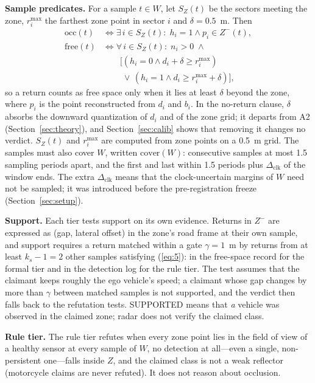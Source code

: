 \textbf{Sample predicates.} For a sample $t \in W$, let $S_Z(t)$ be the sectors meeting the zone, $r_i^{\max}$ the farthest zone point in sector $i$ and $\delta = 0.5$~m. Then
\begin{align}
\mathrm{occ}(t) &\iff \exists\, i \in S_Z(t):\; h_i = 1 \wedge p_i \in Z^-(t), \label{eq:5}\\
\mathrm{free}(t) &\iff \forall\, i \in S_Z(t):\; n_i > 0 \;\wedge \nonumber\\
&\qquad \big[(h_i = 0 \wedge d_i + \delta \ge r_i^{\max}) \nonumber\\
&\qquad\; \vee\, (h_i = 1 \wedge d_i \ge r_i^{\max} + \delta)\big], \label{eq:6}
\end{align}
so a return counts as free space only when it lies at least $\delta$ beyond the zone, where $p_i$ is the point reconstructed from $d_i$ and $b_i$. In the no-return clause, $\delta$ absorbs the downward quantization of $d_i$ and of the zone grid; it departs from A2 (Section~\ref{sec:theory}), and Section~\ref{sec:calib} shows that removing it changes no verdict. $S_Z(t)$ and $r_i^{\max}$ are computed from zone points on a 0.5~m grid. The samples must also cover $W$, written $\mathrm{cover}(W)$: consecutive samples at most 1.5 sampling periods apart, and the first and last within 1.5 periods plus $\Delta_{\mathrm{clk}}$ of the window ends. The extra $\Delta_{\mathrm{clk}}$ means that the clock-uncertain margins of $W$ need not be sampled; it was introduced before the pre-registration freeze (Section~\ref{sec:setup}).

\textbf{Support.} Each tier tests support on its own evidence. Returns in $Z^-$ are expressed as (gap, lateral offset) in the zone's road frame at their own sample, and support requires a return matched within a gate $\gamma = 1$~m by returns from at least $k_s - 1 = 2$ other samples satisfying (\ref{eq:5}): in the free-space record for the formal tier and in the detection log for the rule tier. The test assumes that the claimant keeps roughly the ego vehicle's speed; a claimant whose gap changes by more than $\gamma$ between matched samples is not supported, and the verdict then falls back to the refutation tests. SUPPORTED means that \emph{a} vehicle was observed in the claimed zone; radar does not verify the claimed class.

\textbf{Rule tier.} The rule tier refutes when every zone point lies in the field of view of a healthy sensor at every sample of $W$, no detection at all---even a single, non-persistent one---falls inside $Z$, and the claimed class is not a weak reflector (motorcycle claims are never refuted). It does not reason about occlusion.

